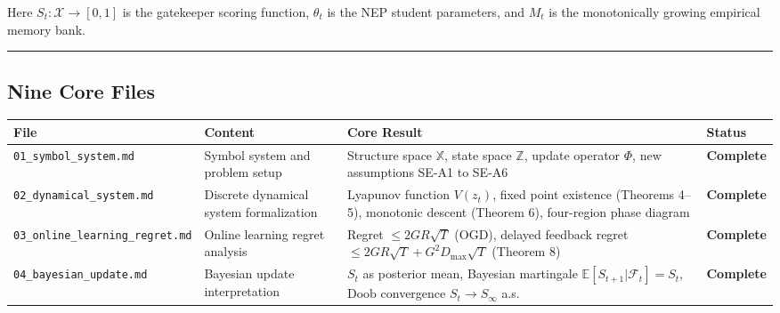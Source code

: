 \documentclass[
  12pt,
]{article}
\begin{document}
Here $S_t: \mathcal{X} \to [0,1]$ is the gatekeeper scoring function, $\theta_t$ is the NEP student parameters, and $M_t$ is the monotonically growing empirical memory bank.

\begin{center}\rule{0.5\linewidth}{0.5pt}\end{center}

\subsection{Nine Core Files}\label{nine-core-files}

\begin{longtable}[]{@{}
  >{\raggedright\arraybackslash}p{}
  >{\raggedright\arraybackslash}p{}
  >{\raggedright\arraybackslash}p{}
  >{\raggedright\arraybackslash}p{}@{}}
\toprule\noalign{}
\begin{minipage}[b]{\linewidth}\raggedright
File
\end{minipage} & \begin{minipage}[b]{\linewidth}\raggedright
Content
\end{minipage} & \begin{minipage}[b]{\linewidth}\raggedright
Core Result
\end{minipage} & \begin{minipage}[b]{\linewidth}\raggedright
Status
\end{minipage} \\
\midrule\noalign{}
\endhead
\bottomrule\noalign{}
\endlastfoot
\texttt{01\_symbol\_system.md} & Symbol system and problem setup & Structure space $\mathbb{X}$, state space $\mathbb{Z}$, update operator $\Phi$, new assumptions SE-A1 to SE-A6 & \textbf{Complete} \\
\texttt{02\_dynamical\_system.md} & Discrete dynamical system formalization & Lyapunov function $V(z_t)$, fixed point existence (Theorems 4--5), monotonic descent (Theorem 6), four-region phase diagram & \textbf{Complete} \\
\texttt{03\_online\_learning\_regret.md} & Online learning regret analysis & Regret $\leq 2GR\sqrt{T}$ (OGD), delayed feedback regret $\leq 2GR\sqrt{T} + G^2 D_{\max}\sqrt{T}$ (Theorem 8) & \textbf{Complete} \\
\texttt{04\_bayesian\_update.md} & Bayesian update interpretation & $S_t$ as posterior mean, Bayesian martingale $\mathbb{E}[S_{t+1}|\mathcal{F}_t]=S_t$, Doob convergence $S_t \to S_\infty$ a.s. & \textbf{Complete} \\

\end{longtable}
\end{document}
